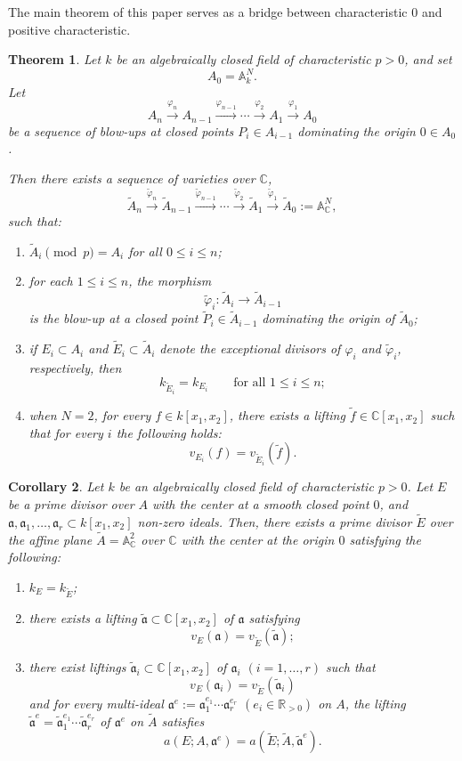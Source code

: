 \documentclass[a4paper]{amsart}
\def\AA{{\mathbb{A}}}
\def\RR{{\mathbb{R}}}
\def\CC{{\mathbb{C}}}
\renewcommand{\a}{{\mathfrak{a}}}
\newcommand{\tf}{{\tilde f}}
\newcommand{\we}{{\widetilde E}}
\newcommand{\taa}{{\widetilde{\mathfrak a}}}
\newcommand{\wa}{{\widetilde{A}}}
\newcommand{\tP}{{\widetilde{P}}}
\newtheorem{thm}{Theorem}[section]
\newtheorem{cor}[thm]{Corollary}
\theoremstyle{definition}
\begin{document}
The main theorem of this paper serves as a bridge between characteristic \(0\) and positive characteristic. 





\begin{thm}\label{newmain}
Let $k$ be an algebraically closed field of characteristic $p>0$, and set
\[
A_0=\AA_k^N.
\]
Let 
\[
A_n \xrightarrow{\varphi_n} A_{n-1} \xrightarrow{\varphi_{n-1}} \cdots
\xrightarrow{\varphi_2} A_1 \xrightarrow{\varphi_1} A_0
\]
be a sequence of blow-ups at closed points $P_i\in A_{i-1}$ dominating the origin $0\in A_0$.

Then there exists a sequence of varieties over $\CC$,
\[
\wa_n \xrightarrow{\widetilde\varphi_n} \wa_{n-1}
\xrightarrow{\widetilde\varphi_{n-1}} \cdots
\xrightarrow{\widetilde\varphi_2} \wa_1
\xrightarrow{\widetilde\varphi_1} \wa_0:=\AA^N_{\CC},
\]
such that:

\begin{enumerate}
\item [(i)]  $\wa_i \pmod p = A_i$ for all $0\le i\le n$;
\item[(ii)] for each $1\le i\le n$, the morphism
\[
\widetilde\varphi_i:\wa_i\to \wa_{i-1}
\]
is the blow-up at a closed point $\tP_i\in \wa_{i-1}$ dominating the origin of $\wa_0$;
\item[(iii)] if $E_i\subset A_i$ and $\we_i\subset \wa_i$ denote the
exceptional divisors of $\varphi_i$ and $\widetilde\varphi_i$, respectively, then
\[
k_{\we_i}=k_{E_i}
\qquad\text{for all }1\le i\le n;
\]
\item[(iv)] when $N=2$, for every $f\in k[x_1,x_2]$, there exists a lifting $\tf\in \CC[x_1,x_2]$
such that for every $i$ the following holds:
$$v_{E_i}(f)=v_{\we_i}(\tf).$$
\end{enumerate}
\end{thm}

 
\begin{cor}\label{main} 
Let  $k$ be an algebraically closed field of characteristic $p>0$.
    Let $E$ be a prime divisor over $A$ with the center at a smooth closed point $0$, and    $\a, \a_1,\ldots, \a_r\subset k[x_1,x_2]$ non-zero  ideals.
     Then, there exists  a prime divisor $\we$ over the affine plane $\wa=\AA_\CC^2$  over $\CC$ with the center
      at the origin $0$ satisfying the following:
  \begin{enumerate}
      \item[(i)]  $k_E=k_{\we}$;
      \item[(ii)]  there exists a lifting $\taa\subset \CC[x_1,x_2]$ of $\a$  satisfying
      $$v_E(\a)=v_{\we}(\taa);$$
     \item[(iii)] there exist liftings $\taa_i\subset \CC[x_1,x_2]$ of $\a_i$ $(i=1,\ldots,r)$ such that
     $$v_E(\a_i)=v_{\we}(\taa_i)$$
                and  for every multi-ideal
                 $\a^e:=\a_1^{e_1}\cdots\a_r^{e_r}$ $(e_i\in \RR_{>0})$ on $A$,
                 the lifting 
                 $\taa^e=\taa_1^{e_1}\cdots\taa_r^{e_r}$ of $\a^e$ on $\wa$
                 satisfies 
                 $$a(E;A,\a^e) =a(\we;\wa,\taa^e).$$ 
                    \end{enumerate}
\end{cor}
\end{document}
